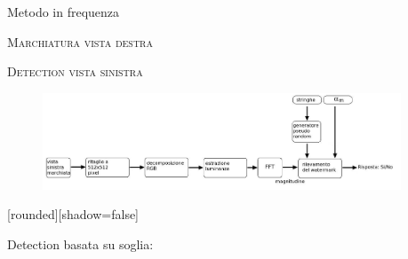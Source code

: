 \documentclass{beamer}
\begin{document}
\begin{section}{Metodo in frequenza}
\begin{frame}[t]{\textsc{Marchiatura vista destra}}
\begin{block}{}
\begin{center}
{  }
\end{center}
\begin{center}
\end{center}
\end{block}
\end{frame}


\begin{frame}[t]{\textsc{Detection vista sinistra}}

\begin{figure}
  \includegraphics[width=0.95\textwidth]{./img_wat/left_det.jpg}
  
  \label{fig:leftdet}
\end{figure}
[rounded][shadow=false]
\begin{block}{Detection basata su soglia:}
\end{block}
\end{frame}


\end{section}
\end{document}
